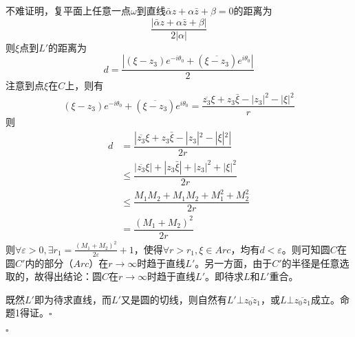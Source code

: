 \documentclass{article}
\newenvironment{SOLUTION}[1][{}]{{\noindent\heiti 解#1：}}{\hfill $\square$\par}
\begin{document}
\begin{SOLUTION}[法1]
    不难证明，复平面上任意一点$\omega$到直线$\bar{\alpha}z+\alpha \bar{z}+\beta=0$的距离为
    \begin{equation}
    \frac{|\bar{\alpha}z+\alpha \bar{z}+\beta|}{2|\alpha|}
    \end{equation}
    则$\xi$点到$L'$的距离为
    \begin{equation}
    d=\frac{|(\xi-z_3)e^{-i\theta_0}+(\overline{\xi-z_3})e^{i\theta_0}|}{2}
    \end{equation}
    注意到点$\xi$在$C$上，则有
    \begin{equation}
    (\xi-z_3)e^{-i\theta_0}+(\overline{\xi-z_3})e^{i\theta_0}=\dfrac{\overline{z_3}\xi+z_3\bar{\xi}-|z_3|^2-|\xi|^2}{r}
    \end{equation}
    则
    \begin{equation}
    \begin{split}
    d&=\dfrac{|\overline{z_3}\xi+z_3\bar{\xi}-|z_3|^2-|\xi|^2|}{2r}\\
    &\le\dfrac{|\overline{z_3}\xi|+|z_3\bar{\xi}|+|z_3|^2+|\xi|^2}{2r}\\
    &\le \dfrac{M_1M_2+M_1M_2+M_1^2+M_2^2}{2r}\\
    &=\dfrac{(M_1+M_2)^2}{2r}
    \end{split}
    \end{equation}
    则$\forall \varepsilon >0,\exists r_1 = \frac{(M_1+M_2)^2}{2\varepsilon}+1$，使得$\forall r>r_1,\xi \in Arc$，均有$d<\varepsilon$。则可知圆$C$在圆$C'$内的部分（$Arc$）在$r\rightarrow\infty$时趋于直线$L'$。另一方面，由于$C'$的半径是任意选取的，故得出结论：圆$C$在$r\rightarrow\infty$时趋于直线$L'$。即待求$L$和$L'$重合。
    
    既然$L'$即为待求直线，而$L'$又是圆的切线，则自然有$L'\bot \overline{z_0z_1}$，或$L\bot \overline{z_0z_1}$成立。命题1得证。\hfill $\square$
    

\end{SOLUTION}
\end{document}
